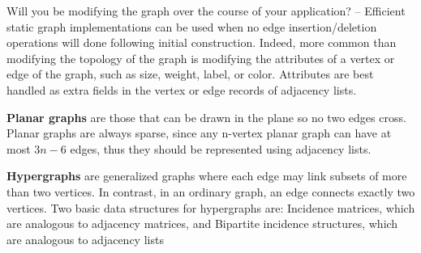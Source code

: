 \documentclass{article}
\begin{document}
    Will you be modifying the graph over the course of your application? – Efficient static graph implementations can be used when no edge insertion/deletion operations will done following initial construction. Indeed, more common than modifying the topology of the graph is modifying the attributes of a vertex or edge of the graph, such as size, weight, label, or color. Attributes are best handled as extra fields in the vertex or edge records of adjacency lists.
    
    \textbf{Planar graphs} are those that can be drawn in the plane so no two edges cross. Planar graphs are always sparse, since any n-vertex planar graph can have at most $3n - 6$ edges, thus they should be represented using adjacency lists. 
    
    \textbf{Hypergraphs} are generalized graphs where each edge may link subsets of more than two vertices. In contrast, in an ordinary graph, an edge connects exactly two vertices. Two basic data structures for hypergraphs are: Incidence matrices, which are analogous to adjacency matrices, and Bipartite incidence structures, which are analogous to adjacency lists
    
\end{document}
